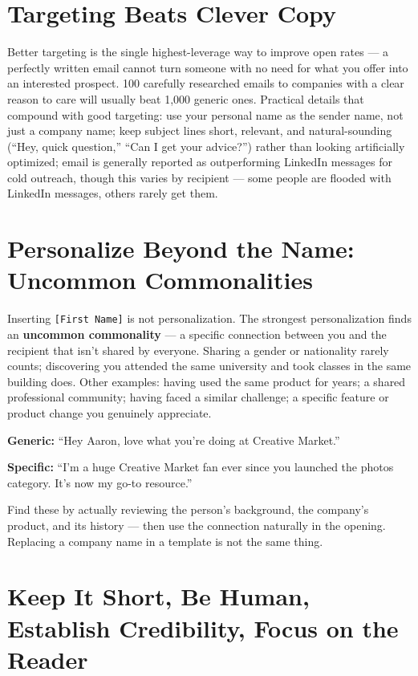 \section{Targeting Beats Clever Copy}

Better targeting is the single highest-leverage way to improve open rates — a perfectly written email cannot
turn someone with no need for what you offer into an interested prospect. 100 carefully researched emails to
companies with a clear reason to care will usually beat 1,000 generic ones. Practical details that compound with
good targeting: use your personal name as the sender name, not just a company name; keep subject lines short,
relevant, and natural-sounding (``Hey, quick question,'' ``Can I get your advice?'') rather than looking
artificially optimized; email is generally reported as outperforming LinkedIn messages for cold outreach, though
this varies by recipient — some people are flooded with LinkedIn messages, others rarely get them.

\section{Personalize Beyond the Name: Uncommon Commonalities}

Inserting \texttt{[First Name]} is not personalization. The strongest personalization finds an \textbf{uncommon
commonality} — a specific connection between you and the recipient that isn't shared by everyone. Sharing a
gender or nationality rarely counts; discovering you attended the same university and took classes in the same
building does. Other examples: having used the same product for years; a shared professional community; having
faced a similar challenge; a specific feature or product change you genuinely appreciate.

\begin{example}
\bad \textbf{Generic:} ``Hey Aaron, love what you're doing at Creative Market.''

\good \textbf{Specific:} ``I'm a huge Creative Market fan ever since you launched the photos category. It's now
my go-to resource.''
\end{example}

Find these by actually reviewing the person's background, the company's product, and its history — then use the
connection naturally in the opening. Replacing a company name in a template is not the same thing.

\section{Keep It Short, Be Human, Establish Credibility, Focus on the Reader}

